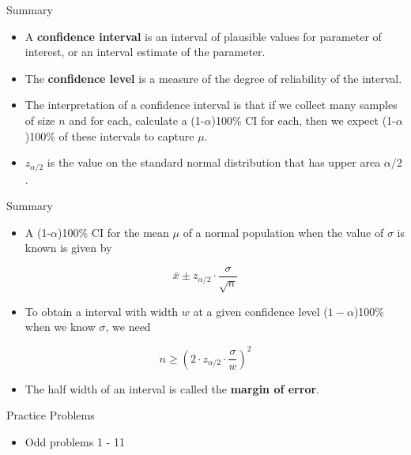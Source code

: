 \documentclass[
  ignorenonframetext,
]{beamer}
\providecommand{\tightlist}{%
  \setlength{\itemsep}{0pt}\setlength{\parskip}{0pt}}\usepackage{longtable,booktabs,array}
\begin{document}
\begin{frame}{Summary}
\protect\hypertarget{summary}{}
\begin{itemize}[<+->]
\tightlist
\item
  A \textbf{confidence interval} is an interval of plausible values for
  parameter of interest, or an interval estimate of the parameter.
\item
  The \textbf{confidence level} is a measure of the degree of
  reliability of the interval.
\item
  The interpretation of a confidence interval is that if we collect many
  samples of size \(n\) and for each, calculate a (1-\(\alpha\))100\% CI
  for each, then we expect (1-\(\alpha\))100\% of these intervals to
  capture \(\mu\).
\item
  \(z_{\alpha/2}\) is the value on the standard normal distribution that
  has upper area \(\alpha/2\).
\end{itemize}
\end{frame}

\begin{frame}{Summary}
\protect\hypertarget{summary-1}{}
\begin{itemize}[<+->]
\tightlist
\item
  A (1-\(\alpha\))100\% CI for the mean \(\mu\) of a normal population
  when the value of \(\sigma\) is known is given by
\end{itemize}

\[
\bar{x} \pm z_{\alpha/2}\cdot \frac{\sigma}{\sqrt{n}}
\]

\begin{itemize}[<+->]
\tightlist
\item
  To obtain a interval with width \(w\) at a given confidence level
  (\(1-\alpha\))100\% when we know \(\sigma\), we need
\end{itemize}

\[
n \geq \left( 2\cdot z_{\alpha/2}\cdot \frac{\sigma}{w}\right)^{2}
\]

\begin{itemize}[<+->]
\tightlist
\item
  The half width of an interval is called the \textbf{margin of error}.
\end{itemize}
\end{frame}

\begin{frame}{Practice Problems}
\protect\hypertarget{practice-problems}{}
\begin{itemize}[<+->]
\tightlist
\item
  Odd problems 1 - 11
\end{itemize}
\end{frame}
\end{document}
